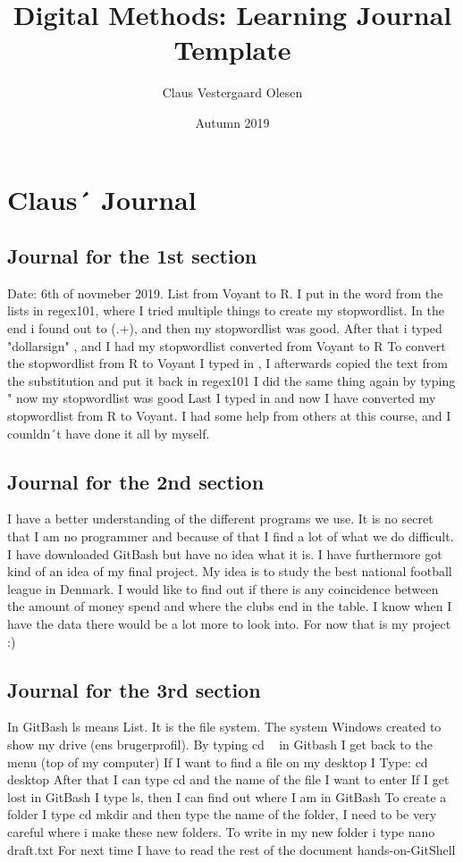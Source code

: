 \documentclass{article}
\title{Digital Methods: Learning Journal Template}
\author{Claus Vestergaard Olesen}
\date{Autumn 2019}
\begin{document}
\section{Claus´ Journal}
\subsection{Journal for the 1st section} Date: 6th of novmeber 2019. List from Voyant to R. 
I put in the word from the lists in regex101, where I tried multiple things to create my stopwordlist. 
In the end i found out to (.+)\n, and then my stopwordlist was good.
After that i typed "dollarsign" , and I had my stopwordlist converted from Voyant to R
To convert the stopwordlist from R to Voyant I typed in ,
I afterwards copied the text from the substitution and put it back in regex101
I did the same thing again by typing " now my stopwordlist was good
Last I typed in \n and now I have converted my stopwordlist from R to Voyant. 
I had some help from others at this course, and I counldn´t have done it all by myself.


\subsection {Journal for the 2nd section}
I have a better understanding of the different programs we use. It is no secret that I am no programmer and because of that I find a lot of what we do difficult.  
I have downloaded GitBash but have no idea what it is. 
I have furthermore got kind of an idea of my final project. 
My idea is to study the best national football league in Denmark. I would like to find out if there is any coincidence between the amount of money spend and where the clubs end in the table. I know when I have the data there would be a lot more to look into. For now that is my project :) 


\subsection {Journal for the 3rd section}
In GitBash ls means List. It is the file system. The system Windows created to show my drive (ens brugerprofil).
By typing cd ~ in Gitbash I get back to the menu (top of my computer)
If I want to find a file on my desktop I Type: 
cd desktop
After that I can type cd and the name of the file I want to enter 
If I get lost in GitBash I type ls, then I can find out where I am in GitBash
To create a folder I type cd mkdir and then type the name of the folder, I need to be very careful where i make these new folders. To write in my new folder i type nano draft.txt 
For next time I have to read the rest of the document hands-on-GitShell
\end{document}
